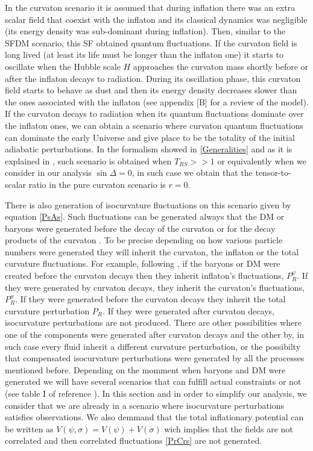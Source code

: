 \documentclass[amssymb,twocolumn,prd,nofootinbib,showpacs]{revtex4-1}
\begin{document}
In the curvaton scenario it is assumed that during inflation there was an extra scalar field that coexist with the inflaton and its classical dynamics was negligible (its energy density was sub-dominant during inflation). Then, similar to the SFDM scenario, this SF obtained quantum fluctuations. If the curvaton field is long lived (at least its life must be longer than the inflaton one) it starts to oscillate when the Hubble scale $H$ approaches the curvaton mass shortly before or after the inflaton decays to radiation. During its oscillation phase, this curvaton field starts to behave as dust and then its energy density decreases slower than the ones associated with the inflaton (see appendix [B] for a review of the model). If the curvaton decays to radiation when its quantum fluctuations dominate over the inflaton ones, we can obtain a scenario where curvaton quantum fluctuations can dominate the early Universe and give place to be the totality of the initial adiabatic perturbations. In the formalism showed in \ref{Generalities} and as it is explained in \cite{twofields}, such scenario is obtained when $T_{RS}>>1$ or equivalently when we consider in our analysis $\sin\Delta = 0$, in such case we obtain that the tensor-to-scalar ratio in the pure curvaton scenario is $r=0$. 

There is also generation of isocurvature fluctuations on this scenario given by equation \eqref{PsAs}. Such fluctuations can be generated always that the DM or baryons were generated before the decay of the curvaton or for the decay products of the curvaton \cite{curvaton9,curvaton10,curvaton11}. To be precise depending on how various particle numbers were generated they will inherit the curvaton, the inflaton or the total curvature fluctuations. For example, following \cite{curv2,curvaton11,curvaton14}, if the baryons or DM were created before the curvaton decays then they inherit inflaton's fluctuations, $P_R^\psi$. If they were generated by curvaton decays, they inherit the curvaton's fluctuations, $P_R^\sigma$. If they were generated before the curvaton decays they inherit the total curvature perturbation $P_R$. If they were generated after curvaton decays, isocurvature perturbations are not produced. There are other possibilities where one of the components were generated after curvaton decays and the other by, in such case every fluid inherit a different curvature perturbation, or the possibilty that compensated isocurvature perturbations \cite{curvaton14} were generated by all the processes mentioned before. Depending on the momment when baryons and DM were generated we will have several scenarios that can fulfill actual constraints or not (see table I of reference \cite{curvaton14}). In this section and in order to simplify our analysis, we consider that we are already in a scenario where isocurvature perturbations satisfies observations. We also demmand that the total inflationary potential can be written as $V(\psi,\sigma)=V(\psi)+V(\sigma)$ wich implies that the fields are not correlated and then correlated fluctuations \eqref{PrCrs} are not generated. 
\end{document}
